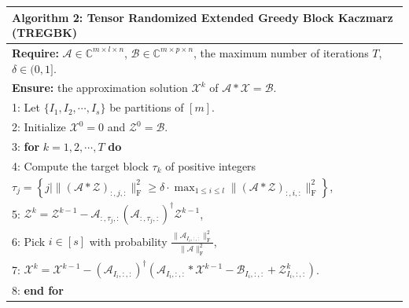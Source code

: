 \documentclass[aspectratio=169]{beamer}
\begin{document}
\begin{frame}[t]{}
\scriptsize
\setlength{\tabcolsep}{2pt}
\renewcommand{\arraystretch}{1.05}
\begin{center}
\begin{tabular*}{\linewidth}{@{\extracolsep{\fill}}l@{}}
\toprule
{\bf Algorithm 2:} Tensor Randomized Extended Greedy Block Kaczmarz (TREGBK)\\
\midrule
{\bf Require:} $\mathcal{A} \in \mathbb{C}^{m\times l\times n}$, $\mathcal{B} \in \mathbb{C}^{m\times p\times n}$, the maximum number of iterations $T$, $\delta \in (0, 1]$.\\
{\bf Ensure:} the approximation solution $\mathcal{X}^k$ of $\mathcal{A}*\mathcal{X} = \mathcal{B}$.\\
1: Let $\{I_1, I_2, \cdots, I_s\}$ be partitions of $[m]$.\\
2: Initialize $\mathcal{X}^0 = 0$ and $\mathcal{Z}^0 = \mathcal{B}$.\\
3: {\bf for} $k = 1, 2, \cdots, T$ {\bf do}\\
4: \quad Compute the target block $\tau_k$ of positive integers\\[4pt]
\quad\quad $\displaystyle\tau_j = \left\{ j \mid \|(\mathcal{A}*\mathcal{Z})_{:,j,:}\|_{\text{F}}^2 \geq \delta \cdot \max_{1\leq i\leq l} \|(\mathcal{A}*\mathcal{Z})_{:,i,:}\|_{\text{F}}^2 \right\}$,\\[8pt]
5: \quad $\displaystyle\mathcal{Z}^k = \mathcal{Z}^{k-1} - \mathcal{A}_{:,\tau_j,:}(\mathcal{A}_{:,\tau_j,:})^\dagger \mathcal{Z}^{k-1}$,\\[8pt]
6: \quad Pick $i \in [s]$ with probability $\displaystyle\frac{\|\mathcal{A}_{I_i,:,:}\|_{\text{F}}^2}{\|\mathcal{A}\|_{\text{F}}^2}$,\\[8pt]
7: \quad $\displaystyle\mathcal{X}^k = \mathcal{X}^{k-1} - (\mathcal{A}_{I_i,:,:})^\dagger(\mathcal{A}_{I_i,:,:}*\mathcal{X}^{k-1} - \mathcal{B}_{I_i,:,:} + \mathcal{Z}^k_{I_i,:,:})$.\\[4pt]
8: {\bf end for}\\
\bottomrule
\end{tabular*}
\end{center}
\end{frame}
\end{document}
